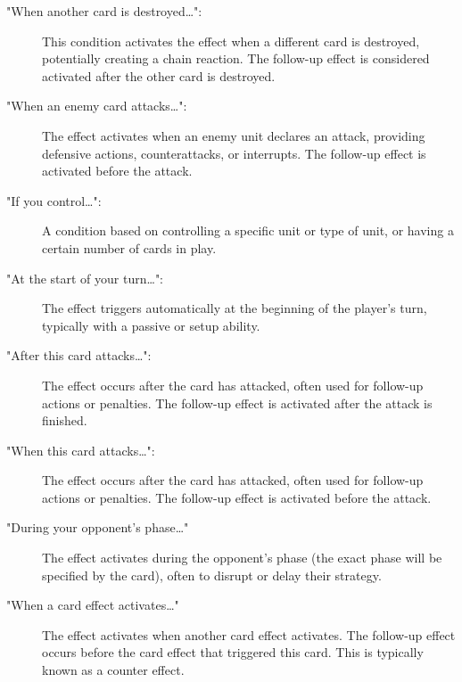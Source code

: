\begin{description}
  \item["When another card is destroyed\dots":] This condition activates the effect when a different card is destroyed, potentially creating a chain reaction. The follow-up effect is considered activated after the other card is destroyed.
  \item["When an enemy card attacks\dots":] The effect activates when an enemy unit declares an attack, providing defensive actions, counterattacks, or interrupts. The follow-up effect is activated before the attack.
  \item["If you control\dots":] A condition based on controlling a specific unit or type of unit, or having a certain number of cards in play.
  \item["At the start of your turn\dots":] The effect triggers automatically at the beginning of the player's turn, typically with a passive or setup ability.
  \item["After this card attacks\dots":] The effect occurs after the card has attacked, often used for follow-up actions or penalties. The follow-up effect is activated after the attack is finished.
  \item["When this card attacks\dots":] The effect occurs after the card has attacked, often used for follow-up actions or penalties. The follow-up effect is activated before the attack.
  \item["During your opponent's phase\dots"]  The effect activates during the opponent's phase (the exact phase will be specified by the card), often to disrupt or delay their strategy.
  \item["When a card effect activates\dots"] The effect activates when another card effect activates. The follow-up effect occurs before the card effect that triggered this card. This is typically known as a counter effect.
\end{description}

    

  
  



